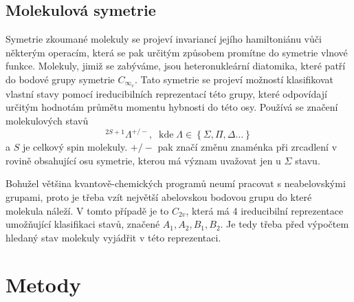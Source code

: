 \subsection{Molekulová symetrie}
Symetrie zkoumané molekuly se projeví invariancí jejího hamiltoniánu vůči některým operacím, která se pak určitým 
způsobem promítne do symetrie vlnové funkce.
Molekuly, jimiž se zabýváme, jsou heteronukleární diatomika, které patří do bodové grupy 
symetrie $C_{\infty_v}$. Tato symetrie se projeví možností klasifikovat vlastní stavy 
pomocí ireducibilních reprezentací této grupy, které odpovídají určitým hodnotám 
průmětu momentu hybnosti do této osy. Používá se značení molekulových stavů
\begin{equation}
^{2S+1}\Lambda^{+/-},\;\;\mathrm{kde }\;\Lambda\in\left\lbrace \Sigma, \Pi,\Delta \dots 
\right\rbrace
\end{equation}
a $S$ je celkový spin molekuly. $+/-$ pak značí změnu znaménka při zrcadlení v rovině 
obsahující osu symetrie, kterou má význam uvažovat jen u $\Sigma$ stavu.

Bohužel většina kvantově-chemických programů neumí pracovat s neabelovskými grupami, 
proto je třeba vzít největší abelovskou bodovou grupu do které molekula náleží. V tomto 
případě je to $C_{2v}$, která má 4 ireducibilní reprezentace umožňující klasifikaci 
stavů, značené $A_1, A_2, B_1, B_2$. Je tedy třeba před výpočtem hledaný stav molekuly 
vyjádřit v této reprezentaci.
\section{Metody}

